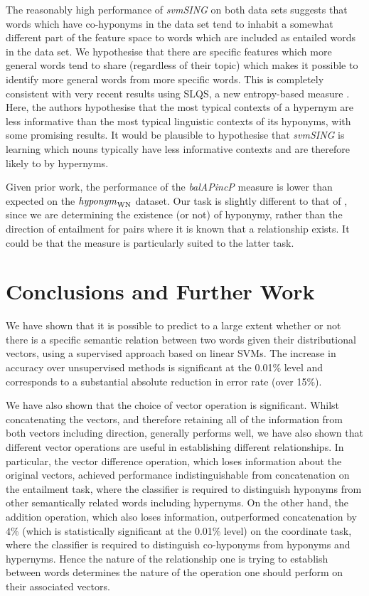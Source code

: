 \documentclass[11pt]{article}
\newcommand\entWN{\mbox{\em hyponym\/}_{\mbox{\scriptsize WN}}}
\begin{document}
The reasonably high performance of \emph{svmSING} on both data sets suggests that words which have co-hyponyms in the data set tend to inhabit a somewhat different part of the feature space to words which are included as entailed words in the data set.  We hypothesise that there are specific features which more general words tend to share (regardless of their topic) which makes it possible to identify more general words from more specific words.   This is completely consistent with very recent results using SLQS, a new entropy-based measure \cite{Santus:14}.  Here, the authors hypothesise that the most typical contexts of a hypernym are less informative than the most typical linguistic contexts of its hyponyms, with some promising results.  It would be plausible to hypothesise that \emph{svmSING} is learning which nouns typically have less informative contexts and are therefore likely to by hypernyms.

Given prior work, the performance of the \emph{balAPincP} measure is lower than expected on the
$\entWN$ dataset. Our task is slightly different to that of
\cite{Kotlerman2010}, since we are determining the existence (or not)
of hyponymy, rather than the direction of entailment for pairs where
it is known that a relationship exists. It could be that the measure
is particularly suited to the latter task.

\section{Conclusions and Further Work}

We have shown that it is possible to predict to a large extent whether
or not there is a specific semantic relation between two words given
their distributional vectors, using a supervised approach based on
linear SVMs. The   increase in accuracy over unsupervised methods is
significant at the 0.01\% level and corresponds to a substantial
absolute reduction in error rate (over 15\%).

We have also shown that the choice of vector operation is significant.  Whilst concatenating the vectors, and therefore retaining all of the information from both vectors including direction, generally performs well, we have also shown that different vector operations are useful in establishing different relationships.  In particular, the vector difference operation, which loses information about the original vectors, achieved performance indistinguishable from concatenation on the entailment task, where the classifier is required to distinguish hyponyms from other semantically related words including hypernyms.  On the other hand, the addition operation, which also loses information, outperformed concatenation by 4\% (which is statistically significant at the 0.01\% level) on the coordinate task, where the classifier is required to distinguish co-hyponyms from hyponyms and hypernyms.  Hence the nature of the relationship one is trying to establish between words determines the nature of the operation one should perform on their associated vectors.  
\end{document}

